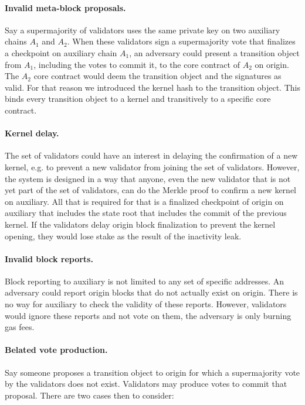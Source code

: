 \documentclass[12pt,a4paper]{article}
\begin{document}
\paragraph{Invalid meta-block proposals.}
Say a supermajority of validators uses the same private key on two auxiliary chains $A_1$ and $A_2$.
When these validators sign a supermajority vote that finalizes a checkpoint on auxiliary chain $A_1$, an adversary could present a transition object from $A_1$, including the votes to commit it, to the core contract of $A_2$ on origin.
The $A_2$ core contract would deem the transition object and the signatures as valid.
For that reason we introduced the kernel hash to the transition object.
This binds every transition object to a kernel and transitively to a specific core contract.

\paragraph{Kernel delay.}
The set of validators could have an interest in delaying the confirmation of a new kernel, e.g. to prevent a new validator from joining the set of validators.
However, the system is designed in a way that anyone, even the new validator that is not yet part of the set of validators, can do the Merkle proof to confirm a new kernel on auxiliary.
All that is required for that is a finalized checkpoint of origin on auxiliary that includes the state root that includes the commit of the previous kernel.
If the validators delay origin block finalization to prevent the kernel opening, they would lose stake as the result of the inactivity leak.

\paragraph{Invalid block reports.}
Block reporting to auxiliary is not limited to any set of specific addresses.
An adversary could report origin blocks that do not actually exist on origin.
There is no way for auxiliary to check the validity of these reports.
However, validators would ignore these reports and not vote on them, the adversary is only burning gas fees.

\paragraph{Belated vote production.}
Say someone proposes a transition object to origin for which a supermajority vote by the validators does not exist.
Validators may produce votes to commit that proposal.
There are two cases then to consider:
\end{document}
